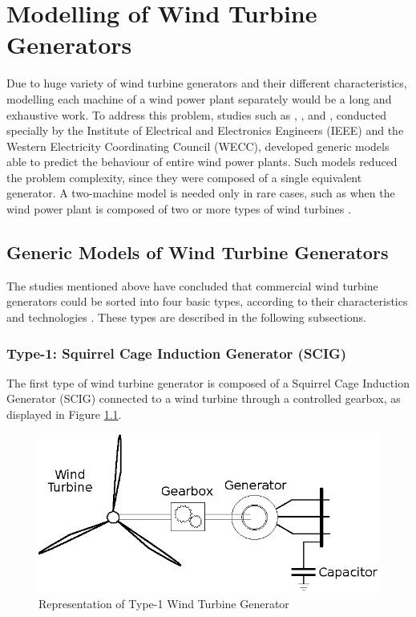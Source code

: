 \chapter{Modelling of Wind Turbine Generators}
\label{ch: Models}

Due to huge variety of wind turbine generators and their different characteristics, modelling each machine of a wind power plant separately would be a long and exhaustive work. To address this problem, studies such as \cite{Muljadi2008}, \cite{Ellis2011}, \cite{council2008wecc} and \cite{Asmine2011}, conducted specially by the Institute of Electrical and Electronics Engineers (IEEE) and the Western Electricity Coordinating Council (WECC), developed generic models able to predict the behaviour of entire wind power plants. Such models reduced the problem complexity, since they were composed of a single equivalent generator. A two-machine model is needed only in rare cases, such as when the wind power plant is composed of two or more types of wind turbines \cite{Ellis2011}.

\section{Generic Models of Wind Turbine Generators}

The studies mentioned above have concluded that commercial wind turbine generators could be sorted into four basic types, according to their characteristics and technologies \cite{Ellis2011}. These types are described in the following subsections.

\subsection{Type-1: Squirrel Cage Induction Generator (SCIG)}

The first type of wind turbine generator is composed of a Squirrel Cage Induction Generator (SCIG) connected to a wind turbine through a controlled gearbox, as displayed in Figure \ref{fig: WTG1}.

\begin{figure}[h]
	\caption{Representation of Type-1 Wind Turbine Generator}
	\begin{center}
		\includegraphics[scale=.8]{Images/Type1WTG.eps}
	\end{center}
	\label{fig: WTG1}
\end{figure}

